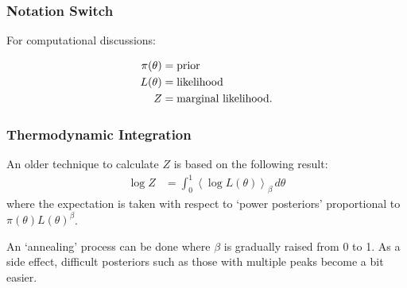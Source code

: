 \documentclass{beamer}
\begin{document}
\begin{frame}
\frametitle{Notation Switch}
For computational discussions:

\begin{align}
\pi(\theta) &= \textnormal{prior} \\
L(\theta) &= \textnormal{likelihood} \\
Z &= \textnormal{marginal likelihood}.
\end{align}

\end{frame}


\begin{frame}
\frametitle{Thermodynamic Integration}
An older technique to calculate $Z$ is based on the following
result:
\begin{align}
\log Z &= \int_0^1 \left<\log L(\theta)\right>_\beta \, d\theta
\end{align}
\pause
where the expectation is taken with respect to `power posteriors'
proportional to $\pi(\theta)L(\theta)^\beta$. \\[0.5em]\pause

An `annealing' process can be done
where $\beta$ is gradually raised from 0 to 1. As a side effect, difficult
posteriors such as those with multiple peaks become a bit easier.

\end{frame}
\end{document}
